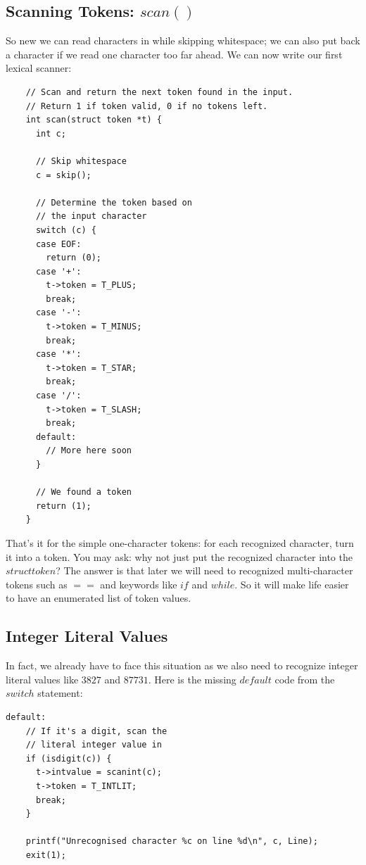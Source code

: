\documentclass[journal, onecolumn, 12pt]{IEEEtran}
\begin{document}
\subsection{Scanning Tokens: $scan()$}

So new we can read characters in while skipping whitespace; we can also put back a character if we read one character too far ahead. We can now write our first lexical scanner:

\begin{lstlisting}
    // Scan and return the next token found in the input.
    // Return 1 if token valid, 0 if no tokens left.
    int scan(struct token *t) {
      int c;

      // Skip whitespace
      c = skip();

      // Determine the token based on
      // the input character
      switch (c) {
      case EOF:
        return (0);
      case '+':
        t->token = T_PLUS;
        break;
      case '-':
        t->token = T_MINUS;
        break;
      case '*':
        t->token = T_STAR;
        break;
      case '/':
        t->token = T_SLASH;
        break;
      default:
        // More here soon
      }

      // We found a token
      return (1);
    }
\end{lstlisting}

That's it for the simple one-character tokens: for each recognized character, turn it into a token. You may ask: why not just put the recognized character into the $struct token$? The answer is that later we will need to recognized multi-character tokens such as $==$ and keywords like $if$ and $while$. So it will make life easier to have an enumerated list of token values.

\subsection{Integer Literal Values}

In fact, we already have to face this situation as we also need to recognize integer literal values like $3827$ and $87731$. Here is the missing $default$ code from the $switch$ statement:

\begin{lstlisting}
default:
    // If it's a digit, scan the
    // literal integer value in
    if (isdigit(c)) {
      t->intvalue = scanint(c);
      t->token = T_INTLIT;
      break;
    }

    printf("Unrecognised character %c on line %d\n", c, Line);
    exit(1);
\end{lstlisting}
\end{document}
